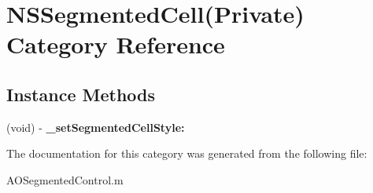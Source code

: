 \hypertarget{category_n_s_segmented_cell_07_private_08}{}\section{N\+S\+Segmented\+Cell(Private) Category Reference}
\label{category_n_s_segmented_cell_07_private_08}
\subsection*{Instance Methods}
\begin{DoxyCompactItemize}
\item 
\mbox{\label{category_n_s_segmented_cell_07_private_08_ab5222e0a36158585726ff1463be88d41}} 
(void) -\/ {\bfseries \+\_\+set\+Segmented\+Cell\+Style\+:}
\end{DoxyCompactItemize}


The documentation for this category was generated from the following file\+:\begin{DoxyCompactItemize}
\item 
A\+O\+Segmented\+Control.\+m\end{DoxyCompactItemize}
